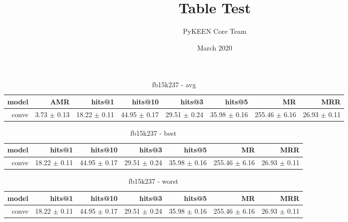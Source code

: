 \documentclass{article}
\title{Table Test}
\author{PyKEEN Core Team}
\date{March 2020}
\begin{document}
    
    \begin{table}
\centering
\caption{fb15k237 - avg}
\begin{tabular}{rrrrrrrr}
\toprule
 model &          AMR &        hits@1 &       hits@10 &        hits@3 &        hits@5 &             MR &           MRR \\
\midrule
 conve &  3.73 $\pm$ 0.13 &  18.22 $\pm$ 0.11 &  44.95 $\pm$ 0.17 &  29.51 $\pm$ 0.24 &  35.98 $\pm$ 0.16 &  255.46 $\pm$ 6.16 &  26.93 $\pm$ 0.11 \\
\bottomrule
\end{tabular}
\end{table}

    
    \begin{table}
\centering
\caption{fb15k237 - best}
\begin{tabular}{rrrrrrr}
\toprule
 model &        hits@1 &       hits@10 &        hits@3 &        hits@5 &             MR &           MRR \\
\midrule
 conve &  18.22 $\pm$ 0.11 &  44.95 $\pm$ 0.17 &  29.51 $\pm$ 0.24 &  35.98 $\pm$ 0.16 &  255.46 $\pm$ 6.16 &  26.93 $\pm$ 0.11 \\
\bottomrule
\end{tabular}
\end{table}

    
    \begin{table}
\centering
\caption{fb15k237 - worst}
\begin{tabular}{rrrrrrr}
\toprule
 model &        hits@1 &       hits@10 &        hits@3 &        hits@5 &             MR &           MRR \\
\midrule
 conve &  18.22 $\pm$ 0.11 &  44.95 $\pm$ 0.17 &  29.51 $\pm$ 0.24 &  35.98 $\pm$ 0.16 &  255.46 $\pm$ 6.16 &  26.93 $\pm$ 0.11 \\
\bottomrule
\end{tabular}
\end{table}

    
\end{document}
